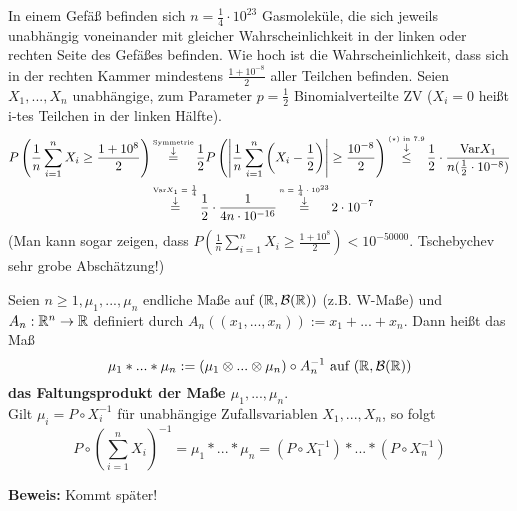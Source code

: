 \documentclass[parskip = full, 12pt]{scrartcl}
\begin{document}
\label{ss: Beispiel 7.10}
	In einem Gefäß befinden sich $n = \frac{1}{4} \cdot 10^{23}$ Gasmoleküle, die
	sich jeweils unabhängig voneinander mit gleicher Wahrscheinlichkeit in der 
	linken oder rechten Seite des Gefäßes befinden. Wie hoch ist die 
	Wahrscheinlichkeit, dass sich in der rechten Kammer mindestens $\frac
	{1 + 10^{-8}}{2}$ aller Teilchen befinden. Seien $X_1, ..., X_n$ unabhängige,
	zum Parameter $p = \frac{1}{2}$ Binomialverteilte ZV ($X_i = 0$ heißt \glqq
	i-tes Teilchen in der linken Hälfte\grqq).
	\begin{align*}
		P\left( \frac{1}{n} \sum_{i=1}^n X_i \geq \frac{1+10^8}{2}  \right) 
			& \mathop{=} \limits^{\mathop{\downarrow} \limits^{\textrm{Symmetrie}}}
		\frac{1}{2} P \left( \left| \frac{1}{n} \sum_{i=1}^n \left( X_i - 
			\frac{1}{2} \right)	\right| \geq \frac{10^{-8}}{2} \right) 
			\mathop{\leq} \limits^{\mathop{\downarrow} \limits^{\textrm{($\star$) in 7.9}}}
		\frac{1}{2} \cdot \frac{\textrm{Var} X_1}{n(\frac{1}{2} \cdot 10^{-8})} \\
			& \mathop{=} \limits^{\mathop{\downarrow} \limits^{\textrm{$\textrm{Var} X_1 = \frac{1}{4}$}}}
		\frac{1}{2} \cdot \frac{1}{4n \cdot 10^{-16}} 
			\mathop{=} \limits^{\mathop{\downarrow} \limits^{\textrm{$n = \frac{1}{4} \cdot 10^{23}$}}}
		2 \cdot 10^{-7}
	\end{align*}
	(Man kann sogar zeigen, dass $P\left( \frac{1}{n} \sum_{i=1}^n X_i \geq 
	\frac{1+10^8}{2}  \right) < 10^{-50000}$. Tschebychev sehr grobe
	Abschätzung!)

\label{ss: Definition und Satz 7.11}
	Seien $n \geq 1, \mu_1, ..., \mu_n$ endliche Maße auf $(\mathbb{R}, \mathcal{B}(\mathbb{R}))$ 
	(z.B. W-Maße) und $A_n: \mathbb{R}^n \rightarrow \mathbb{R}$ definiert durch $A_n
	((x_1, ..., x_n)) := x_1 + ... + x_n$. Dann heißt das Maß 
	$$\mu_1 * ... * \mu_n	:= (\mu_1 \otimes ... \otimes \mu_n) \circ A_n^{-1} 
	\textrm{ auf } (\mathbb{R}, \mathcal{B}(\mathbb{R})) $$ 
	\textbf{das Faltungsprodukt der Maße $\mu_1, ..., \mu_n$}.\\
	Gilt $\mu_i = P \circ X_i^{-1}$ für unabhängige Zufallsvariablen $X_1, ..., 
	X_n$, so folgt 
	$$ P \circ {(\sum_{i=1}^n X_i)}^{-1} = \mu_1 * ... * \mu_n = 
		(P \circ X_1^{-1}) * ... * (P \circ X_n^{-1})$$

	\textbf{Beweis:} Kommt später!


	
\end{document}
